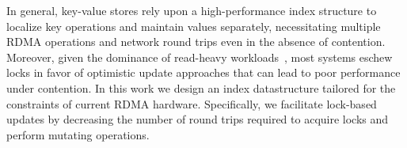 In general, key-value stores rely upon a high-performance index
structure to localize key operations and maintain values separately,
necessitating multiple RDMA operations and network round trips even in
the absence of contention.  Moreover, given the dominance of
read-heavy workloads~\cite{rocks-db-workload,facebook-memcached}, most
systems eschew locks in favor of optimistic update approaches that can
lead to poor performance under contention.
%
%
%
%
%
In this work we design an index datastructure tailored for the
constraints of current RDMA hardware.  Specifically, we
facilitate lock-based updates by decreasing the number of round
trips required to acquire locks and perform mutating operations.

